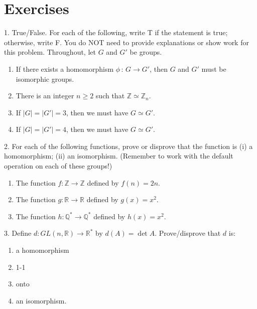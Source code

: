 \documentclass[10pt,openany,oneside]{book}
\theoremstyle{plain}
\theoremstyle{definition}
\theoremstyle{definition}
\theoremstyle{definition}
\theoremstyle{definition}
\numberwithin{equation}{section}
\def\Z{\mathbb{Z}}
\def\R{\mathbb{R}}
\def\Q{\mathbb{Q}}
\begin{document}
\section[{Exercises}]{Exercises}\label{exercises-4}
\begin{exerciselist}
\item[1.]\hypertarget{exercise-21}{}True/False. For each of the following, write T if the statement is true; otherwise, write F. You do NOT need to provide explanations or show work for this problem. Throughout, let \(G\) and \(G'\) be groups. \leavevmode%
\begin{enumerate}[label=(\alph*)]
\item\hypertarget{li-158}{}If there exists a homomorphism \(\phi\,:\,G\to G'\), then \(G\) and \(G'\) must be isomorphic groups.%
\item\hypertarget{li-159}{}There is an integer \(n\geq 2\) such that \(\Z\simeq \Z_n\).%
\item\hypertarget{li-160}{}If \(|G|=|G'|=3\), then we must have \(G\simeq G'\).%
\item\hypertarget{li-161}{}If \(|G|=|G'|=4\), then we must have \(G\simeq G'\).%
\end{enumerate}
%
\par\smallskip
\item[2.]\hypertarget{exercise-22}{}For each of the following functions, prove or disprove that the function is (i) a homomorphism; (ii) an isomorphism. (Remember to work with the default operation on each of these groups!) \leavevmode%
\begin{enumerate}[label=(\alph*)]
\item\hypertarget{li-166}{}The function \(f:\Z\to\Z\) defined by \(f(n)=2n\).%
\item\hypertarget{li-167}{}The function \(g:\R\to\R\) defined by \(g(x)=x^2\).%
\item\hypertarget{li-168}{}The function \(h:\Q^*\to\Q^*\) defined by \(h(x)=x^2\).%
\end{enumerate}
%
\par\smallskip
\item[3.]\hypertarget{exercise-23}{}Define \(d : GL(n,\R)\to \R^*\) by \(d(A)=\det A\). Prove/disprove that \(d\) is: \leavevmode%
\begin{enumerate}[label=(\alph*)]
\item\hypertarget{li-178}{}a homomorphism%
\item\hypertarget{li-179}{}1-1%
\item\hypertarget{li-180}{}onto%
\item\hypertarget{li-181}{}an isomorphism.%

\end{enumerate}
\end{exerciselist}
\end{document}
